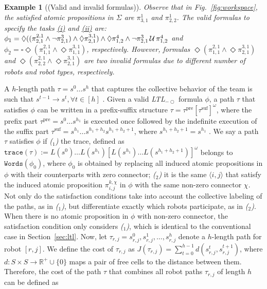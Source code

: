 \documentclass[Afour,sageh,times]{sagej}
\newtheorem{exmp}{Example}
\newcounter{mycounter}
\newcommand{\ltl}{ {\it LTL}$_{-\bigcirc}$ }
\newcommand{\ag}[2]{\langle#1,#2\rangle}
\renewcommand{\ap}[3]{\mathcal{\pi}_{{#1},{#2}}^{#3}}
\newenvironment{cexmp}
{\addtocounter{exmp}{-1}\begin{exmp}}
  {\end{exmp}}
\begin{document}
 \begin{cexmp} [(Valid and invalid formulas)]
Observe that in Fig.~\ref{fig:workspace}, the satisfied atomic propositions in $\Sigma$ are $\ap{3}{1}{1}$ and $\ap{2}{2}{1}$.   The valid formulas to specify the tasks \hyperref[task:i]{\it (i)} and \hyperref[task:ii]{\it (ii)} are: $\phi_1 = \Diamond \Large((\ap{2}{1}{2,1}\wedge \neg \ap{2}{1}{3}) \wedge  \Diamond \ap{2}{1}{3,1}\Large)  \wedge \Diamond \ap{1}{2}{4} \wedge \neg \ap{2}{1}{3} \,\mathcal{U}\, \ap{1}{2}{4}$ and $ \phi_2 = \square \Diamond (\ap{1}{1}{2,1} \wedge \Diamond \ap{1}{1}{3,1})$, respectively. However, formulas $\Diamond (\ap{1}{1}{2,1} \wedge \Diamond \ap{2}{1}{3,1})$ and $\Diamond (\ap{2}{2}{2,1} \wedge \Diamond \ap{2}{1}{3,1})$ are two invalid formulas due to different number of robots and robot types, respectively.
 \end{cexmp}
 A $h$-length path $\tau = s^0 \ldots s^h$ that captures the collective behavior of the team is such that $s^{t-1}\to s^{t}, \forall t\in[h]$%
 .  Given a valid\ltl formula $\phi$, a  path $\tau$ that satisfies $\phi$ can be written in a prefix-suffix structure $\tau=\tau^{\text{pre}}[\tau^{\text{suf}}]^\omega$, where the prefix part  $\tau^{\text{pre}}=s^0 \dots s^{h_1}$ is executed once followed by the indefinite execution of the suffix part $\tau^{\text{suf}}=s^{h_1} \dots s^{h_1+h_2} s^{h_1+h_2+1}$, where $s^{h_1+h_2+1}=s^{h_1}$ \citep{baier2008principles}. We say a path $\tau$ satisfies $\phi$ if {\it ($_1$)} the trace, defined as $\texttt{trace}(\tau):=L(s^0)\dots L(s^{h_1})[L(s^{h_1})\dots L(s^{h_1+h_2+1})]^{\omega}$  belongs to $\texttt{Words}(\phi_0)$, where $\phi_0$ is obtained by replacing all induced atomic propositions in $\phi$ with their counterparts with zero connector; {\it ($_2$)} it is the same $\ag{i}{j}$ that satisfy the induced atomic proposition $\ap{i}{j}{k,\chi}$ in $\phi$ with the same non-zero connector $\chi$. Not only do the satisfaction conditions take into account the collective labeling of the paths, as in {\it ($_1$)}, but differentiate exactly which robots participate, as in {\it ($_2$)}. When there is no atomic proposition in $\phi$ with non-zero connector, the satisfaction condition only considers {\it ($_1$)}, which is identical to the conventional case in Section~\ref{sec:ltl}. Now, let $\tau_{r,j} = s_{r,j}^0, s_{r,j}^1, \ldots, s_{r,j}^h$ denote a $h$-length path  for robot $[r,j]$. We define the cost of $\tau_{r,j}$  as $J(\tau_{r,j}) = \sum_{t=0}^{h-1} d(s_{r,j}^{t}, s_{r,j}^{t+1})$, where $d: S\times S \to \mathbb{R}^+\cup\{0\}$ maps a pair of free cells to the distance between them. Therefore, the cost of the path $\tau$ that combines all robot paths $\tau_{r,j}$ of length $h$ can be defined as
\end{document}
